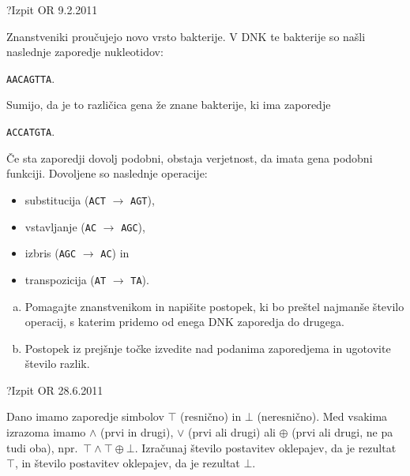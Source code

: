 \begin{naloga}{?}{Izpit OR 9.2.2011}
\begin{vprasanje}
Znanstveniki proučujejo novo vrsto bakterije.
V DNK te bakterije so našli na\-sled\-nje zaporedje nukleotidov:
\begin{center}
{\tt AACAGTTA}.
\end{center}
Sumijo, da je to različica gena že znane bakterije, ki ima zaporedje
\begin{center}
{\tt ACCATGTA}.
\end{center}
Če sta zaporedji dovolj podobni,
obstaja verjetnost, da imata gena podobni funkciji.
Dovoljene so naslednje operacije:
\begin{itemize}
\item substitucija ({\tt ACT} $\to$ {\tt AGT}),
\item vstavljanje ({\tt AC} $\to$ {\tt AGC}),
\item izbris ({\tt AGC} $\to$ {\tt AC}) in
\item transpozicija ({\tt AT} $\to$ {\tt TA}).
\end{itemize}
\begin{enumerate}[(a)]
\item Pomagajte znanstvenikom in napišite postopek,
ki bo preštel najmanše število operacij,
s katerim pridemo od enega DNK zaporedja do drugega.
\item Postopek iz prejšnje točke izvedite nad podanima zaporedjema
in ugotovite število razlik.
\end{enumerate}
\end{vprasanje}
\begin{odgovor}
\end{odgovor}
\end{naloga}


\begin{naloga}{?}{Izpit OR 28.6.2011}
\begin{vprasanje}
Dano imamo zaporedje simbolov $\top$ (resnično) in $\bot$ (neresnično).
Med vsakima izrazoma imamo $\land$ (prvi in drugi),
$\lor$ (prvi ali drugi) ali $\oplus$ (prvi ali drugi, ne pa tudi oba),
npr.~$\top \land \top \oplus \bot$.
Izračunaj število postavitev oklepajev, da je rezultat $\top$,
in število postavitev oklepajev, da je rezultat $\bot$.
\end{vprasanje}
\begin{odgovor}
\end{odgovor}
\end{naloga}


